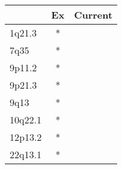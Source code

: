 \begin{tabular}{lcc}
\toprule
{} & Ex & Current \\
\midrule
1q21.3  &  * &         \\
7q35    &  * &         \\
9p11.2  &  * &         \\
9p21.3  &  * &         \\
9q13    &  * &         \\
10q22.1 &  * &         \\
12p13.2 &  * &         \\
22q13.1 &  * &         \\
\bottomrule
\end{tabular}
